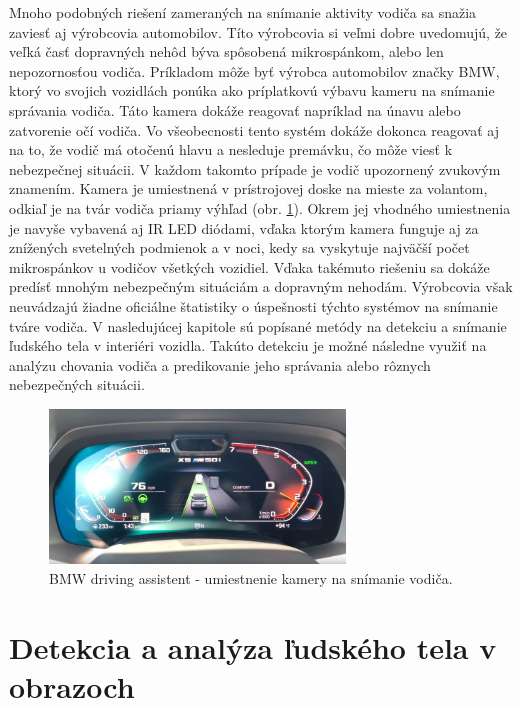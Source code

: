\documentclass[slovak,master,dept460,male,cpp,cpdeclaration]{diploma}
\begin{document}
Mnoho podobných riešení zameraných na snímanie aktivity vodiča sa snažia zaviesť aj výrobcovia automobilov. Títo výrobcovia si veľmi dobre uvedomujú, že veľká časť dopravných nehôd býva spôsobená mikrospánkom, alebo len nepozornosťou vodiča. Príkladom môže byť výrobca automobilov značky BMW, ktorý vo svojich vozidlách ponúka ako príplatkovú výbavu kameru na snímanie správania vodiča. Táto kamera dokáže reagovať napríklad na únavu alebo zatvorenie očí vodiča. Vo všeobecnosti tento systém dokáže dokonca reagovať aj na to, že vodič má otočenú hlavu a nesleduje premávku, čo môže viesť k nebezpečnej situácii. V každom takomto prípade je vodič upozornený zvukovým znamením. Kamera je umiestnená v prístrojovej doske na mieste za volantom, odkiaľ je na tvár vodiča priamy výhľad (obr. \ref{fig:bmwAssistent}). Okrem jej vhodného umiestnenia je navyše vybavená aj IR LED diódami, vďaka ktorým kamera funguje aj za znížených svetelných podmienok a v noci, kedy sa vyskytuje najväčší počet mikrospánkov u vodičov všetkých vozidiel. Vďaka takémuto riešeniu sa dokáže predísť mnohým nebezpečným situáciám a dopravným nehodám. Výrobcovia však neuvádzajú žiadne oficiálne štatistiky o úspešnosti týchto systémov na snímanie tváre vodiča. V nasledujúcej kapitole sú popísané metódy na detekciu a snímanie ľudského tela  v interiéri vozidla. Takúto detekciu je možné následne využiť na analýzu chovania vodiča  a predikovanie jeho správania alebo rôznych nebezpečných situácii.

\begin{figure}[H]
	\centering
	\includegraphics[width=0.7\textwidth]{Figures/bmw.jpg}
	\caption{BMW driving assistent - umiestnenie kamery na snímanie vodiča.\cite{bmw2019assistent}}
	\label{fig:bmwAssistent}
\end{figure}





\newpage
\section{Detekcia a analýza ľudského tela v obrazoch}
\label{sec:human body decection}
\end{document}
